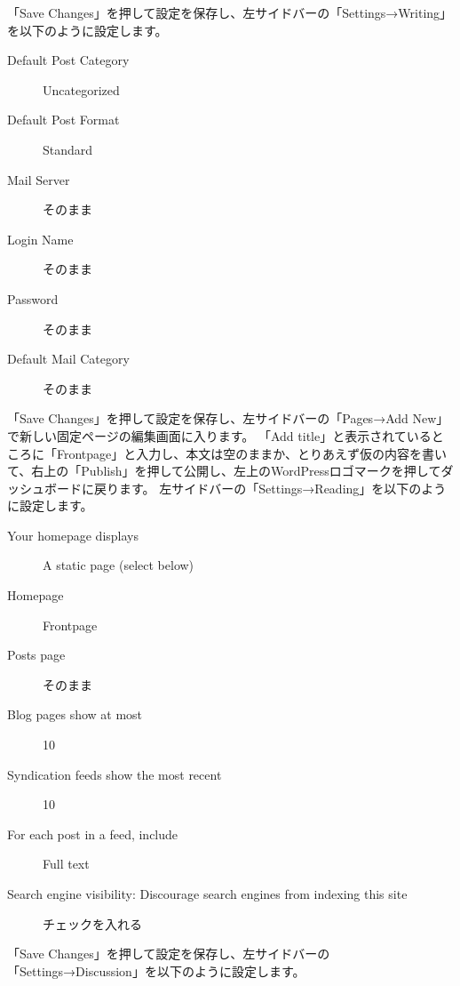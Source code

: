 \documentclass[titlepage,10pt,a4paper,uplatex]{jsbook}
\begin{document}
「Save Changes」を押して設定を保存し、左サイドバーの「Settings→Writing」を以下のように設定します。

\begin{description}
\item[Default Post Category] Uncategorized
\item[Default Post Format] Standard
\item[Mail Server] そのまま
\item[Login Name] そのまま
\item[Password] そのまま
\item[Default Mail Category] そのまま
\end{description}

「Save Changes」を押して設定を保存し、左サイドバーの「Pages→Add New」で新しい固定ページの編集画面に入ります。
「Add title」と表示されているところに「Frontpage」と入力し、本文は空のままか、とりあえず仮の内容を書いて、右上の「Publish」を押して公開し、左上のWordPressロゴマークを押してダッシュボードに戻ります。
左サイドバーの「Settings→Reading」を以下のように設定します。

\begin{description}
\item[Your homepage displays] A static page (select below)
\item[Homepage] Frontpage
\item[Posts page] そのまま
\item[Blog pages show at most] 10
\item[Syndication feeds show the most recent] 10
\item[For each post in a feed, include] Full text
\item[Search engine visibility: Discourage search engines from indexing this site] チェックを入れる
\end{description}

「Save Changes」を押して設定を保存し、左サイドバーの「Settings→Discussion」を以下のように設定します。
\end{document}
